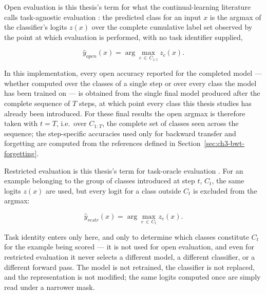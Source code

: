 Open evaluation is this thesis's term for what the continual-learning
literature calls task-agnostic evaluation \parencite{masana2020classincremental}: the
predicted class for an input $x$ is the argmax of the classifier's logits
$z(x)$ over the complete cumulative label set observed by the point at
which evaluation is performed, with no task identifier supplied,

\begin{equation}
\label{eq:ch3-open-eval}
\hat y_{open}(x) = \arg\max_{c\,\in\,C_{1:t}} z_c(x).
\end{equation}

In this implementation, every open accuracy reported for the completed
model --- whether computed over the classes of a single step or over every
class the model has been trained on --- is obtained from the single final
model produced after the complete sequence of $T$ steps, at which point
every class this thesis studies has already been introduced. For these
final results the open argmax is therefore taken with $t=T$, i.e.\ over
$C_{1:T}$, the complete set of classes seen across the sequence; the
step-specific accuracies used only for backward transfer and forgetting
are computed from the references defined in
Section~\ref{sec:ch3-bwt-forgetting}.

Restricted evaluation is this thesis's term for task-oracle evaluation
\parencite{masana2020classincremental}. For an example belonging to the group of classes
introduced at step $t$, $C_t$, the same logits $z(x)$ are used, but every
logit for a class outside $C_t$ is excluded from the argmax:

\begin{equation}
\label{eq:ch3-restricted-eval}
\hat y_{restr}(x) = \arg\max_{c\,\in\,C_t} z_c(x).
\end{equation}

Task identity enters only here, and only to determine which classes
constitute $C_t$ for the example being scored --- it is not used for open
evaluation, and even for restricted evaluation it never selects a
different model, a different classifier, or a different forward pass. The
model is not retrained, the classifier is not replaced, and the
representation is not modified; the same logits computed once are simply
read under a narrower mask.

